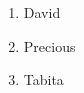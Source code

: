 \documentclass{article}
\begin{document}
	
	\begin{enumerate}
		\item David
		\item Precious
		\item Tabita
	\end{enumerate}
\end{document}
